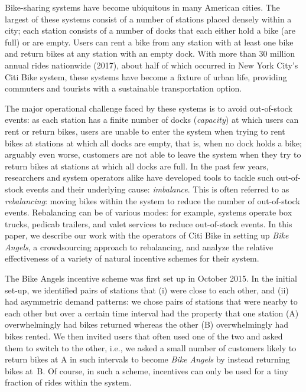 Bike-sharing systems have become ubiquitous in many American cities. The largest of these systems consist of a number of stations placed densely within a city; each station consists of a number of docks that each either hold a bike (are full) or are empty. Users can rent a bike from any station with at least one bike and return bikes at any station with an empty dock. With more than 30 million annual rides nationwide (2017), about half of which occurred in New York City's Citi Bike system, these systems have become a fixture of urban life, providing commuters and tourists with a sustainable transportation option.

The major operational challenge faced by these systems is to avoid out-of-stock events: as each station has a finite number of docks (\emph{capacity}) at which users can rent or return bikes, users are unable to enter the system when trying to rent bikes at stations at which all docks are empty, that is, when no dock holds a bike; arguably even worse, customers are not able to leave the system when they try to return bikes at stations at which all docks are full. In the past few years, researchers and system operators alike have developed tools to tackle such out-of-stock events and their underlying cause: \emph{imbalance}. This is often referred to as \emph{rebalancing}: moving bikes within the system to reduce the number of out-of-stock events. Rebalancing can be of various modes: for example, systems operate box trucks, pedicab trailers, and valet services to reduce out-of-stock events. In this paper, we describe our work with the operators of Citi Bike in setting up \emph{Bike Angels}, a crowdsourcing approach to rebalancing, and analyze the relative effectiveness of a variety of natural incentive schemes for their system.

The Bike Angels incentive scheme was first set up in October 2015. In the initial set-up, we identified pairs of stations that (i) were close to each other, and (ii) had asymmetric demand patterns: we chose pairs of stations that were nearby to each other but over a certain time interval had the property that one station (A) overwhelmingly had bikes returned whereas the other (B) overwhelmingly had bikes rented. We then invited users that often used one of the two and asked them to switch to the other, i.e., we asked a small number of customers likely to return bikes at A in such intervals to become \emph{Bike Angels} by instead returning bikes at~B. Of course, in such a scheme, incentives can only be used for a tiny fraction of rides within the system.

